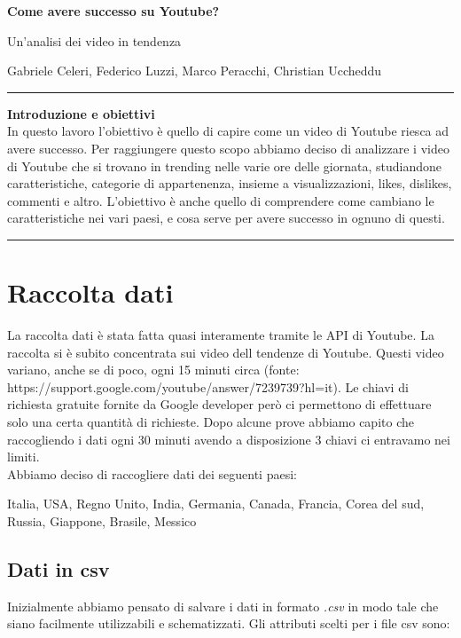 \documentclass[10pt, a4paper,openany]{article}
\begin{document}
\begin{center}
\huge\textbf{Come avere successo su Youtube?}

Un'analisi dei video in tendenza
\end{center}

\begin{center}
Gabriele Celeri, Federico Luzzi,  Marco Peracchi, Christian Uccheddu
\end{center}

\hrule
\vspace{0.5cm}

\begin{center}\textbf{{Introduzione e obiettivi}}
\\

In questo lavoro l'obiettivo è quello di capire come un video di Youtube riesca ad avere successo. Per raggiungere questo scopo abbiamo deciso di analizzare i video di Youtube che si trovano in trending nelle varie ore delle giornata, studiandone caratteristiche, categorie di appartenenza, insieme a visualizzazioni, likes, dislikes, commenti e altro.
L'obiettivo è anche quello di comprendere come cambiano le caratteristiche nei vari paesi, e cosa serve per avere successo in ognuno di questi.

\vspace{0.5cm}
\hrule
\end{center}

\section*{Raccolta dati}
La raccolta dati è stata fatta quasi interamente tramite le API di Youtube. La raccolta si è subito concentrata sui video dell tendenze di Youtube. Questi video variano, anche se di poco, ogni 15 minuti circa (fonte: https://support.google.com/youtube/answer/7239739?hl=it). Le chiavi di richiesta gratuite fornite da Google developer però ci permettono di effettuare solo una certa quantità di richieste. Dopo alcune prove abbiamo capito che raccogliendo i dati ogni 30 minuti avendo a disposizione 3 chiavi ci entravamo nei limiti. 
\\
Abbiamo deciso di raccogliere dati dei seguenti paesi:

Italia, USA, Regno Unito, India, Germania, Canada, Francia, Corea del sud, Russia, Giappone, Brasile, Messico\\

\subsection*{Dati in csv}
Inizialmente abbiamo pensato di salvare i dati in formato \textit{.csv} in modo tale che siano facilmente utilizzabili e schematizzati. Gli attributi scelti per i file csv sono:
\end{document}
